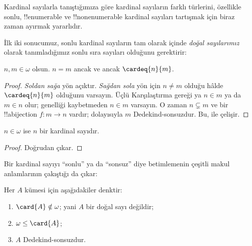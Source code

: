 


Kardinal sayılarla tanıştığımıza göre kardinal sayıların farklı türlerini,
özellikle sonlu, !!{enumerable} ve !!{nonenumerable} kardinal sayıları
tartışmak için biraz zaman ayırmak yararlıdır.

İlk iki sonucumuz, sonlu kardinal sayıların tam olarak
 içinde \emph{doğal sayılarımız}
olarak tanımladığımız sonlu sıra sayıları olduğunu gerektirir:

\begin{prop}
$n,m\in\omega$ olsun. $n=m$ ancak ve ancak $\cardeq{n}{m}$.
\end{prop}

\begin{proof}
\emph{Soldan sağa} yön açıktır. \emph{Sağdan sola} yön için $n\neq m$
olduğu hâlde $\cardeq{n}{m}$ olduğunu varsayın. Üçlü Karşılaştırma gereği
ya $n\in m$ ya da $m\in n$ olur; genelliği kaybetmeden $n\in m$ varsayın.
O zaman $n\subsetneq m$ ve bir !!a{bijection} $f\colon m\to n$ vardır;
dolayısıyla $m$ Dedekind-sonsuzdur. Bu,
 ile çelişir.
\end{proof}

\begin{cor}
$n\in\omega$ ise $n$ bir kardinal sayıdır.
\end{cor}

\begin{proof}
Doğrudan çıkar.
\end{proof}
\noindent
Bir kardinal sayıyı ``sonlu'' ya da ``sonsuz'' diye betimlemenin çeşitli
makul anlamlarının çakıştığı da çıkar:
\begin{thm}
Her $A$ kümesi için aşağıdakiler denktir:
\begin{enumerate}
	\item{} $\card{A}\notin\omega$; yani $A$ bir
	doğal sayı değildir;
	\item{} $\omega\leq\card{A}$;
	\item{} $A$ Dedekind-sonsuzdur.
\end{enumerate}
\end{thm}

